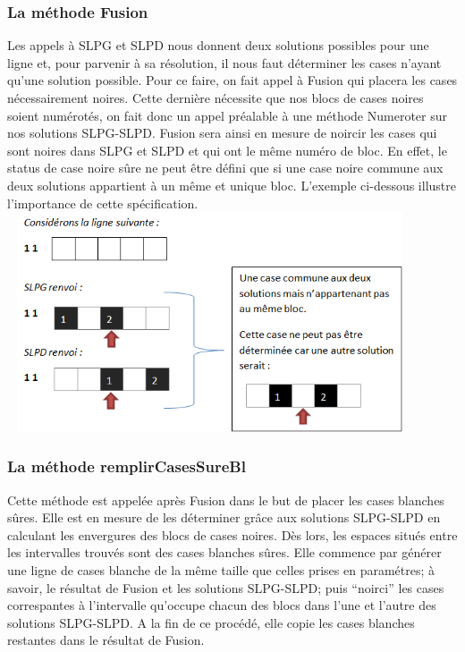 \documentclass{article}
\begin{document}
\subsubsection{La méthode Fusion}
Les appels à SLPG et SLPD nous donnent deux solutions possibles pour une ligne et, pour parvenir à sa résolution, il nous faut déterminer les cases n'ayant qu'une solution possible. 
\newline
Pour ce faire, on fait appel à Fusion qui placera les cases nécessairement noires.
Cette dernière nécessite que nos blocs de cases noires soient numérotés, on fait donc un appel préalable à une méthode Numeroter sur nos solutions SLPG-SLPD.
\newline
Fusion sera ainsi en mesure de noircir les cases qui sont noires dans SLPG et SLPD et qui ont le même numéro de bloc.
En effet, le status de case noire sûre ne peut être défini que si une case noire commune aux deux solutions appartient à un même et unique bloc.
\newline
L'exemple ci-dessous illustre l'importance de cette spécification.  
\newline
\includegraphics[height=6.5cm,width=12cm]{Exemple1}
\subsubsection{La méthode remplirCasesSureBl}
Cette méthode est appelée après Fusion dans le but de placer les cases blanches sûres. Elle est en mesure de les déterminer grâce aux solutions SLPG-SLPD en calculant les envergures des blocs de cases noires. Dès lors, les espaces situés entre les intervalles trouvés sont des cases blanches sûres.\newline
Elle commence par générer une ligne de cases blanche de la même taille que celles prises en paramétres; à savoir, le résultat de Fusion et les solutions SLPG-SLPD; puis ``noirci'' les cases correspantes à l'intervalle qu'occupe chacun des blocs dans l'une et l'autre des solutions SLPG-SLPD.
\newline
A la fin de ce procédé, elle copie les cases blanches restantes dans le résultat de Fusion.
\end{document}
